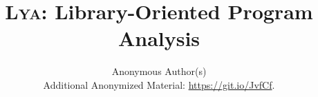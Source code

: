\documentclass[letterpaper,twocolumn,10pt]{article}
\newcommand{\sys}{{\scshape Lya}\xspace}
\begin{document}

\date{}

\title{\Large \bf \sys: Library-Oriented Program Analysis}

\author{
{\rm Anonymous Author(s)}\\
\normalsize{Additional Anonymized Material: \href{https://git.io/JvfCf}{https://git.io/JvfCf}.}
}

\maketitle
\end{document}
